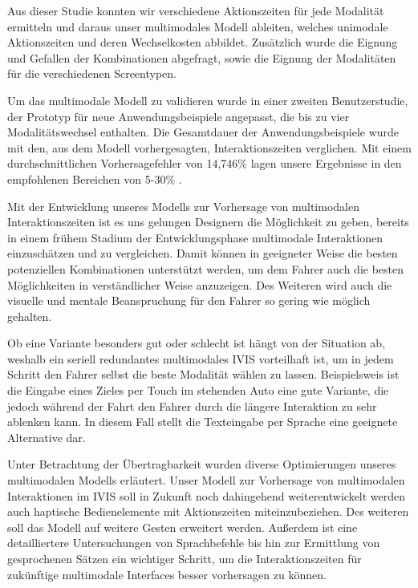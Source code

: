 Aus dieser Studie konnten wir verschiedene Aktionszeiten für jede Modalität ermitteln und daraus unser multimodales Modell ableiten, welches unimodale Aktionszeiten und deren Wechselkosten abbildet. 
Zusätzlich wurde die Eignung und Gefallen der Kombinationen abgefragt, sowie die Eignung der Modalitäten für die verschiedenen Screentypen.

Um das multimodale Modell zu validieren wurde in einer zweiten Benutzerstudie, der Prototyp für neue Anwendungsbeispiele angepasst, die bis zu vier Modalitätswechsel enthalten.
Die Gesamtdauer der Anwendungsbeispiele wurde mit den, aus dem Modell vorhergesagten, Interaktionszeiten verglichen. 
Mit einem durchschnittlichen Vorhersagefehler von 14,746\% lagen unsere Ergebnisse in den empfohlenen Bereichen von 5-30\% \citep{Card_1980, Luo_2005,Teo:2006}. 

Mit der Entwicklung unseres Modells zur Vorhersage von multimodalen Interaktionszeiten ist es uns gelungen Designern die Möglichkeit zu geben, bereits in einem frühem Stadium der Entwicklungsphase multimodale Interaktionen einzuschätzen und zu vergleichen. 
Damit können in geeigneter Weise die besten potenziellen Kombinationen unterstützt werden, um dem Fahrer auch die besten Möglichkeiten in verständlicher Weise anzuzeigen. 
Des Weiteren wird auch die visuelle und mentale Beanspruchung für den Fahrer so gering wie möglich gehalten. 

Ob eine Variante besonders gut oder schlecht ist hängt von der Situation ab, weshalb ein seriell redundantes multimodales IVIS vorteilhaft ist, um in jedem Schritt den Fahrer selbst die beste Modalität wählen zu lassen. 
Beispielsweis ist die Eingabe eines Zieles per Touch im stehenden Auto eine gute Variante, die jedoch während der Fahrt den Fahrer durch die längere Interaktion zu sehr ablenken kann. 
In diesem Fall stellt die Texteingabe per Sprache eine geeignete Alternative dar.

Unter Betrachtung der Übertragbarkeit wurden diverse Optimierungen unseres multimodalen Modells erläutert.
Unser Modell zur Vorhersage von multimodalen Interaktionen im IVIS soll in Zukunft noch dahingehend weiterentwickelt werden auch haptische Bedienelemente mit Aktionszeiten miteinzubeziehen. 
Des weiteren soll das Modell auf weitere Gesten erweitert werden. 
Außerdem ist eine detailliertere Untersuchungen von Sprachbefehle bis hin zur Ermittlung von gesprochenen Sätzen ein wichtiger Schritt, um die Interaktionszeiten für zukünftige multimodale Interfaces besser vorhersagen zu können.

